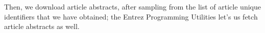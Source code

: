 Then, we download article abstracts, after sampling from the list of article
unique identifiers that we have obtained; the Entrez Programming Utilities
let's us fetch article abstracts as well.
